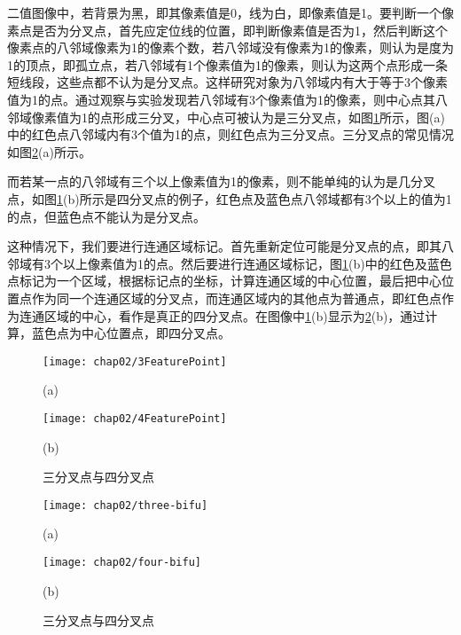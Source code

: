二值图像中，若背景为黑，即其像素值是0，线为白，即像素值是1。要判断一个像素点是否为分叉点，首先应定位线的位置，即判断像素值是否为1，然后判断这个像素点的八邻域像素为1的像素个数，若八邻域没有像素为1的像素，则认为是度为1的顶点，即孤立点，若八邻域有1个像素值为1的像素，则认为这两个点形成一条短线段，这些点都不认为是分叉点。这样研究对象为八邻域内有大于等于3个像素值为1的点。通过观察与实验发现若八邻域有3个像素值为1的像素，则中心点其八邻域像素值为1的点形成三分叉，中心点可被认为是三分叉点，如图\ref{fig:FeaturePoints}所示，图(a)中的红色点八邻域内有3个值为1的点，则红色点为三分叉点。三分叉点的常见情况如图\ref{fig:FeaturePoints-image}(a)所示。

而若某一点的八邻域有三个以上像素值为1的像素，则不能单纯的认为是几分叉点，如图\ref{fig:FeaturePoints}(b)所示是四分叉点的例子，红色点及蓝色点八邻域都有3个以上的值为1的点，但蓝色点不能认为是分叉点。

这种情况下，我们要进行连通区域标记。首先重新定位可能是分叉点的点，即其八邻域有3个以上像素值为1的点。然后要进行连通区域标记，图\ref{fig:FeaturePoints}(b)中的红色及蓝色点标记为一个区域，根据标记点的坐标，计算连通区域的中心位置，最后把中心位置点作为同一个连通区域的分叉点，而连通区域内的其他点为普通点，即红色点作为连通区域的中心，看作是真正的四分叉点。在图像中\ref{fig:FeaturePoints}(b)显示为\ref{fig:FeaturePoints-image}(b)，通过计算，蓝色点为中心位置点，即四分叉点。

\begin{figure}
\centering
  \begin{minipage}[b]{0.48\textwidth} 
      \centering 
      \texttt{[image: chap02/3FeaturePoint]}
        \centerline{(a)}\medskip
	 \label{fig:3FeaturePoint}
    \end{minipage}
  \begin{minipage}[b]{0.48\textwidth}
    \centering
    \texttt{[image: chap02/4FeaturePoint]}
      \centerline{(b)}\medskip
	\label{fig:4FeaturePoint}
  \end{minipage}
\caption{三分叉点与四分叉点}
\label{fig:FeaturePoints}
\end{figure}

\begin{figure}
\centering
  \begin{minipage}[b]{1\textwidth} 
      \centering 
      \texttt{[image: chap02/three-bifu]}
        \centerline{(a)}\medskip
    \end{minipage}
  \begin{minipage}[b]{1\textwidth}
    \centering
    \texttt{[image: chap02/four-bifu]}
      \centerline{(b)}\medskip
  \end{minipage}
\caption{三分叉点与四分叉点}
\label{fig:FeaturePoints-image}
\end{figure}


